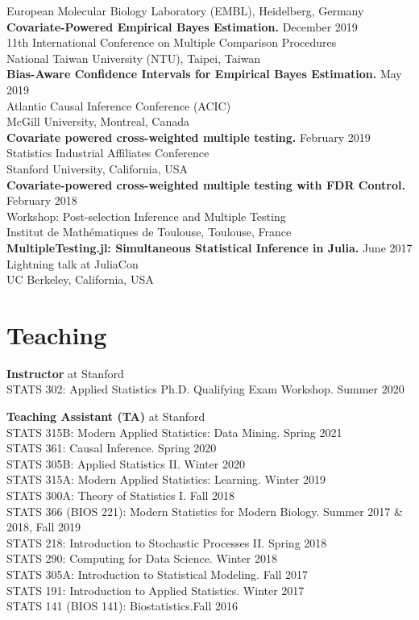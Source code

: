 \documentclass[margin,line]{res}
\newcommand{\ver}{\vspace*{-2.7mm}}
\begin{document}
\begin{resume}
European Molecular Biology Laboratory (EMBL), Heidelberg, Germany\\
\textbf{Covariate-Powered Empirical Bayes Estimation.} \hfill December 2019\\
11th International Conference on Multiple Comparison Procedures\\
National Taiwan University (NTU), Taipei, Taiwan\\
\textbf{Bias-Aware Confidence Intervals for Empirical Bayes Estimation.} \hfill May 2019\\
Atlantic Causal Inference Conference (ACIC)\\
McGill University, Montreal, Canada\\
\textbf{Covariate powered cross-weighted multiple testing.} \hfill February 2019\\
Statistics Industrial Affiliates Conference\\
Stanford University, California, USA\\
\textbf{Covariate-powered cross-weighted multiple testing with FDR Control.} \hfill February 2018\\
Workshop: Post-selection Inference and Multiple Testing\\
Institut de Mathématiques de Toulouse, Toulouse, France\\
\textbf{MultipleTesting.jl: Simultaneous Statistical Inference in Julia.} \hfill June 2017\\
Lightning talk at JuliaCon\\
UC Berkeley, California, USA





\section{\sc Teaching}
\textbf{Instructor} at Stanford\\
STATS 302: Applied Statistics Ph.D. Qualifying Exam Workshop. \hfill Summer 2020

\ver
\textbf{Teaching Assistant (TA)} at Stanford\\
STATS 315B: Modern Applied Statistics: Data Mining. \hfill Spring 2021\\ 
STATS 361: Causal Inference. \hfill Spring 2020\\
STATS 305B: Applied Statistics II. \hfill Winter 2020\\
STATS 315A: Modern Applied Statistics: Learning. \hfill Winter 2019\\
STATS 300A: Theory of Statistics I. \hfill Fall 2018\\
STATS 366 (BIOS 221): Modern Statistics for Modern Biology. \hfill Summer 2017 \& 2018, Fall 2019\\
STATS 218: Introduction to Stochastic Processes II. \hfill Spring 2018\\
STATS 290: Computing for Data Science. \hfill Winter 2018\\
STATS 305A: Introduction to Statistical Modeling. \hfill Fall 2017\\
STATS 191: Introduction to Applied Statistics. \hfill Winter 2017\\
STATS 141 (BIOS 141): Biostatistics.\hfill Fall 2016


\end{resume}
\end{document}
